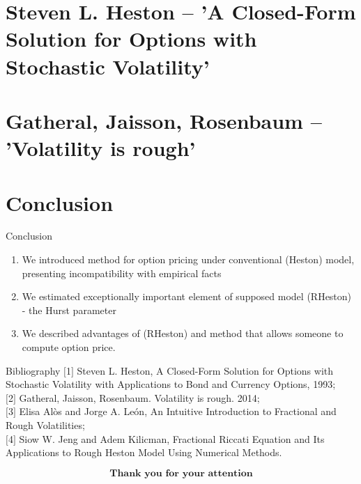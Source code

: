 


    \begin{frame}
        \maketitle
    \end{frame}

    \section{Steven L. Heston -- 'A Closed-Form Solution for Options with Stochastic Volatility'}
    

    \section{Gatheral, Jaisson, Rosenbaum -- 'Volatility is rough'}
    

    \section{Conclusion}
        \begin{frame}{Conclusion}
            \begin{enumerate}
                \item We introduced method for option pricing under conventional (Heston) model, presenting incompatibility with empirical facts
                \item We estimated exceptionally important element of supposed model (RHeston) - the Hurst parameter
                \item We described advantages of (RHeston) and method that allows someone to compute option price.
            \end{enumerate}
        \end{frame}

        \begin{frame}{Bibliography}
            $[$1$]$ Steven L. Heston, A Closed-Form Solution for Options with Stochastic Volatility with Applications to Bond and Currency Options, 1993;\\

            $[$2$]$ Gatheral, Jaisson, Rosenbaum. Volatility is rough. 2014;\\

            $[$3$]$ Elisa Alòs and Jorge A. León, An Intuitive Introduction to Fractional and Rough Volatilities;\\

            $[$4$]$ Siow W. Jeng and Adem Kilicman, Fractional Riccati Equation and Its Applications to Rough Heston Model Using Numerical Methods.\\
        \end{frame}

        \begin{frame}
            $$\textbf{Thank you for your attention}$$
        \end{frame}


